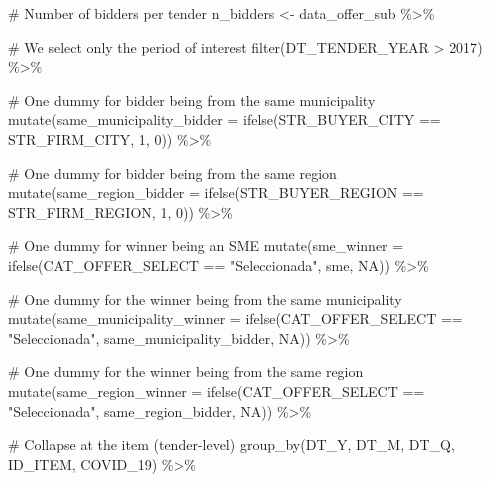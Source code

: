 \documentclass[
]{report}
\newenvironment{Shaded}{\begin{snugshade}}{\end{snugshade}}
\newcommand{\AttributeTok}[1]{\textcolor[rgb]{0.40,0.45,0.13}{#1}}
\newcommand{\CommentTok}[1]{\textcolor[rgb]{0.37,0.37,0.37}{#1}}
\newcommand{\ConstantTok}[1]{\textcolor[rgb]{0.56,0.35,0.01}{#1}}
\newcommand{\DecValTok}[1]{\textcolor[rgb]{0.68,0.00,0.00}{#1}}
\newcommand{\FunctionTok}[1]{\textcolor[rgb]{0.28,0.35,0.67}{#1}}
\newcommand{\NormalTok}[1]{\textcolor[rgb]{0.00,0.23,0.31}{#1}}
\newcommand{\OtherTok}[1]{\textcolor[rgb]{0.00,0.23,0.31}{#1}}
\newcommand{\SpecialCharTok}[1]{\textcolor[rgb]{0.37,0.37,0.37}{#1}}
\newcommand{\StringTok}[1]{\textcolor[rgb]{0.13,0.47,0.30}{#1}}
\begin{document}
\begin{Shaded}
\begin{Highlighting}[]
\CommentTok{\# Number of bidders per tender}
\NormalTok{n\_bidders }\OtherTok{\textless{}{-}}\NormalTok{ data\_offer\_sub }\SpecialCharTok{\%\textgreater{}\%} 
  
  \CommentTok{\# We select only the period of interest}
  \FunctionTok{filter}\NormalTok{(DT\_TENDER\_YEAR }\SpecialCharTok{\textgreater{}} \DecValTok{2017}\NormalTok{) }\SpecialCharTok{\%\textgreater{}\%} 
  
  \CommentTok{\# One dummy for bidder being from the same municipality}
  \FunctionTok{mutate}\NormalTok{(}\AttributeTok{same\_municipality\_bidder =} \FunctionTok{ifelse}\NormalTok{(STR\_BUYER\_CITY }\SpecialCharTok{==}\NormalTok{ STR\_FIRM\_CITY, }\DecValTok{1}\NormalTok{, }\DecValTok{0}\NormalTok{)) }\SpecialCharTok{\%\textgreater{}\%} 
  
  \CommentTok{\# One dummy for bidder being from the same region}
  \FunctionTok{mutate}\NormalTok{(}\AttributeTok{same\_region\_bidder       =} \FunctionTok{ifelse}\NormalTok{(STR\_BUYER\_REGION }\SpecialCharTok{==}\NormalTok{ STR\_FIRM\_REGION, }\DecValTok{1}\NormalTok{, }\DecValTok{0}\NormalTok{)) }\SpecialCharTok{\%\textgreater{}\%} 
  
  \CommentTok{\# One dummy for winner being an SME}
  \FunctionTok{mutate}\NormalTok{(}\AttributeTok{sme\_winner               =} \FunctionTok{ifelse}\NormalTok{(CAT\_OFFER\_SELECT }\SpecialCharTok{==} \StringTok{"Seleccionada"}\NormalTok{, sme, }\ConstantTok{NA}\NormalTok{)) }\SpecialCharTok{\%\textgreater{}\%} 
  
  \CommentTok{\# One dummy for the winner being from the same municipality}
  \FunctionTok{mutate}\NormalTok{(}\AttributeTok{same\_municipality\_winner =} \FunctionTok{ifelse}\NormalTok{(CAT\_OFFER\_SELECT }\SpecialCharTok{==} \StringTok{"Seleccionada"}\NormalTok{, same\_municipality\_bidder, }\ConstantTok{NA}\NormalTok{)) }\SpecialCharTok{\%\textgreater{}\%} 
  
  \CommentTok{\# One dummy for the winner being from the same region}
    \FunctionTok{mutate}\NormalTok{(}\AttributeTok{same\_region\_winner =} \FunctionTok{ifelse}\NormalTok{(CAT\_OFFER\_SELECT }\SpecialCharTok{==} \StringTok{"Seleccionada"}\NormalTok{, same\_region\_bidder, }\ConstantTok{NA}\NormalTok{)) }\SpecialCharTok{\%\textgreater{}\%} 
  
  \CommentTok{\# Collapse at the item (tender{-}level)}
  \FunctionTok{group\_by}\NormalTok{(DT\_Y, DT\_M, DT\_Q, ID\_ITEM, COVID\_19) }\SpecialCharTok{\%\textgreater{}\%} 
  

\end{Highlighting}
\end{Shaded}
\end{document}
